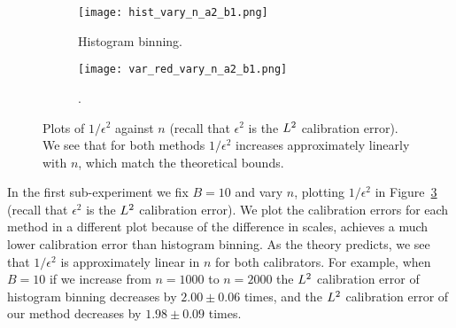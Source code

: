 \begin{figure}
  \centering
  \centering
     \begin{subfigure}[b]{0.48\textwidth}
         \centering
         \texttt{[image: hist\_vary\_n\_a2\_b1.png]}
         \caption{Histogram binning.
         }
         \label{fig:well-spec-vary-n-hist}
     \end{subfigure}
     \hfill
     \begin{subfigure}[b]{0.48\textwidth}
         \centering
         \texttt{[image: var\_red\_vary\_n\_a2\_b1.png]}
         \caption{\Ourcal{}.
         }
         \label{fig:well-spec-vary-n-var-red}
     \end{subfigure}
  \caption{
    Plots of $1/\epsilon^2$ against $n$ (recall that $\epsilon^2$ is the $L^2$ calibration error). We see that for both methods $1/\epsilon^2$ increases approximately linearly with $n$, which match the theoretical bounds.
}
  \label{fig:well-spec-vary-n}
\end{figure}

In the first sub-experiment we fix $B = 10$ and vary $n$, plotting $1/\epsilon^2$ in Figure~\ref{fig:well-spec-vary-n} (recall that $\epsilon^2$ is the $L^2$ calibration error). We plot the calibration errors for each method in a different plot because of the difference in scales, \ourcal{} achieves a much lower calibration error than histogram binning. As the theory predicts, we see that $1/\epsilon^2$ is approximately linear in $n$ for both calibrators. For example, when $B=10$ if we increase from $n=1000$ to $n=2000$ the $L^2$ calibration error of histogram binning decreases by $2.00 \pm 0.06$ times, and the $L^2$ calibration error of our method decreases by $1.98 \pm 0.09$ times.


